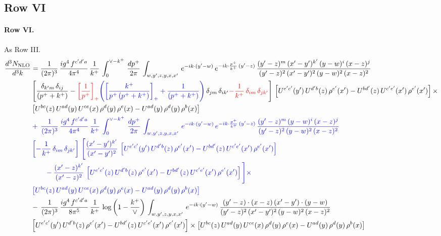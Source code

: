 \documentclass[10pt]{article}
\numberwithin{equation}{section}
\newcommand{\new}[1]{{\color{blue}#1}}
\newcommand{\old}[1]{{\color{red}#1}}
\newcommand{\nc}{\color{blue}}
\begin{document}
\subsection{Row VI}
\paragraph{Row VI.}
As Row III.
\begin{align}
    \frac{d^{3}N_{\rm NLO}}{d^{3}k} & =  \frac{1}{(2\pi)^{3}}\, \frac{ig^{4}\,f^{c'd'a}}{4\pi^{4}}\, \frac{1}{k^{+}}\,\int_{0}^{\vee-k^{+}}\, \frac{dp^{+}}{2\pi}\, \int_{w,y',z,y,x,x'}\, e^{-ik\cdot (y'-w)}\, e^{-ik\cdot \frac{p^{+}}{k^{+}}\,(y'-z)}\,\frac{(y'-z)^{m}\,(x'-y')^{k'}\,(y-w)^{i}\,(x-z)^{j}}{(y'-z)^{2}\,(x'-y')^{2}\,(y-w)^{2}\,(x-z)^{2}}\notag \\ & \left[\frac{\delta_{k'm}\,\delta_{ij}}{(p^{+}+k^{+})}-\old{\left[\frac{1}{p^{+}}\right]_{+}}\new{\left(\left[\frac{k^{+}}{p^{+}\,(p^{+}+k^{+})}\right]_{+}+\frac{1}{(p^{+}+k^{+})}\right)}\,\delta_{jm}\,\delta_{ik'}\old{-\frac{1}{k^{+}}\, \delta_{im}\, \delta_{jk'}}\right]\, \left[U^{e'c'}(y')\,U^{d'b}(z)\,\rho^{e'}(x')-U^{bd'}(z)\,U^{c'e'}(x')\,\rho^{e'}(x')\right]\times\notag \\ &  \left[U^{bc}(z)\,U^{ad}(y)\,U^{ce}(x)\,\rho^{d}(y)\,\rho^{e}(x)-U^{ad}(y)\,\rho^{d}(y)\,\rho^{b}(x)\right] \notag \\
& \nc  +\,\frac{1}{(2\pi)^{3}}\, \frac{ig^{4}\,f^{c'd'a}}{4\pi^{4}}\, \frac{1}{k^{+}}\,\int_{0}^{\vee-k^{+}}\, \frac{dp^{+}}{2\pi}\, \int_{w,y',z,y,x,x'}\, e^{-ik\cdot (y'-w)}\, e^{-ik\cdot \frac{p^{+}}{k^{+}}\,(y'-z)}\,\frac{(y'-z)^{m}\,(y-w)^{i}\,(x-z)^{j}}{(y'-z)^{2}\,(y-w)^{2}\,(x-z)^{2}}\notag \\ & \nc  \left[-\frac{1}{k^{+}}\, \delta_{im}\, \delta_{jk'}\right]\, \Bigg[\frac{(x'-y')^{k'}}{(x'-y')^{2}}\,\left[U^{e'c'}(y')\,U^{d'b}(z)\,\rho^{e'}(x')-U^{bd'}(z)\,U^{c'e'}(x')\,\rho^{e'}(x')\right]\notag \\ & \nc  \qquad-\frac{(x'-z)^{k'}}{(x'-z)^{2}}\,\left[U^{e'c'}(z)\,U^{d'b}(z)\,\rho^{e'}(x')-U^{bd'}(z)\,U^{c'e'}(x')\,\rho^{e'}(x')\right]\Bigg]\times\notag \\ & \nc   \left[U^{bc}(z)\,U^{ad}(y)\,U^{ce}(x)\,\rho^{d}(y)\,\rho^{e}(x)-U^{ad}(y)\,\rho^{d}(y)\,\rho^{b}(x)\right] \notag \\
&  -\,\frac{1}{(2\pi)^{3}}\, \frac{ig^{4}\,f^{c'd'a}}{8\pi^{5}}\, \frac{1}{k^{+}}\,\log{\left(1-\frac{k^{+}}{\vee}\right)}\, \int_{w,y',z,y,x,x'}\, e^{-ik\cdot (y'-w)}\,\frac{(y'-z)\cdot (x-z)\,(x'-y')\cdot (y-w)}{(y'-z)^{2}\,(x'-y')^{2}\,(y-w)^{2}\,(x-z)^{2}}\notag \\ & \left[U^{e'c'}(y')\,U^{d'b}(z)\,\rho^{e'}(x')-U^{bd'}(z)\,U^{c'e'}(x')\,\rho^{e'}(x')\right]\times  \left[U^{bc}(z)\,U^{ad}(y)\,U^{ce}(x)\,\rho^{d}(y)\,\rho^{e}(x)-U^{ad}(y)\,\rho^{d}(y)\,\rho^{b}(x)\right] \label{eq:F:G3VI}
\end{align}
\end{document}
